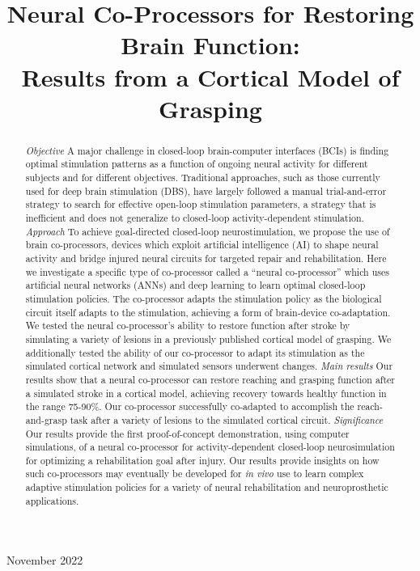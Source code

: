 \documentclass[12pt]{iopart}
\begin{document}
\title[Neural Co-Processors]
{Neural Co-Processors for Restoring Brain Function:\\Results from a Cortical Model of Grasping}



\vspace{10pt}
\begin{indented}
\item[]November 2022
\end{indented}

\begin{abstract}
\textit{Objective} A major challenge in closed-loop brain-computer interfaces (BCIs)
is finding optimal stimulation patterns as a function of ongoing neural activity for
different subjects and for different objectives. Traditional approaches, such as
those currently used for deep brain stimulation (DBS), have largely followed a manual
trial-and-error strategy to search for effective open-loop stimulation parameters,
a strategy that is inefficient and does not generalize to closed-loop
activity-dependent stimulation.
\textit{Approach} To achieve goal-directed closed-loop neurostimulation, we propose
the use of brain co-processors, devices which exploit artificial intelligence (AI)
to shape neural activity and bridge injured neural circuits for targeted repair and
rehabilitation.  Here we investigate a specific type of co-processor called a ``neural
co-processor'' which uses artificial neural networks (ANNs) and deep learning to learn optimal
closed-loop stimulation policies. The co-processor adapts the stimulation policy as
the biological circuit itself adapts to the stimulation, achieving a form of brain-device
co-adaptation. We tested the neural co-processor's ability to restore function after
stroke by simulating a variety of lesions in a previously published cortical model
of grasping.  We additionally tested the ability of our co-processor
to adapt its stimulation as the simulated cortical network and simulated sensors
underwent changes.
\textit{Main results} Our results show that a neural co-processor can restore
reaching and grasping function after a simulated stroke in a cortical model, achieving
recovery towards healthy function in the range 75-90\%. Our co-processor successfully
co-adapted to accomplish the reach-and-grasp task after a variety of lesions to the
simulated cortical circuit.
\textit{Significance} Our results provide the first proof-of-concept demonstration,
using computer simulations, of a neural co-processor for activity-dependent closed-loop
neurosimulation for optimizing a rehabilitation goal after injury. Our results provide
insights on how such co-processors may eventually be developed for \textit{in vivo} use
to learn complex adaptive stimulation policies for a variety of neural rehabilitation
and neuroprosthetic applications. 
\end{abstract}
\end{document}
